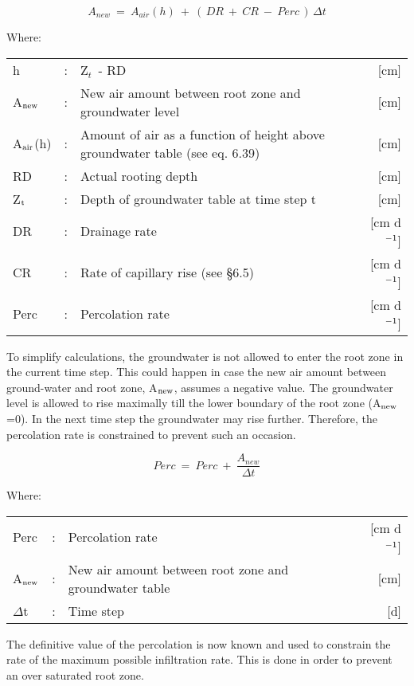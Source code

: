 \begin{equation}
 A_{new} ~=~ A_{air} (h) ~+~ (\, DR ~+~ CR ~-~ Perc\, )\, \Delta t
\end{equation}

Where:\\[5pt]
\begin{tabularx}{\textwidth}{llXr}
h &:& Z$_{t~}$ - RD & [cm]\\
A$_{{\rm new}}$ &:& New air amount between root zone and groundwater level  & [cm]\\
A$_{{\rm air}}$(h) &:& Amount of air as a function of height above groundwater
   table  (see eq. 6.39) & [cm]\\
RD &:& Actual rooting depth  & [cm]\\
Z$_{{\rm t}}$ &:& Depth of groundwater table at time step t  & [cm]\\
DR &:& Drainage rate  & [cm d$^{{\rm -1}}$]\\
CR &:& Rate of capillary rise (see \S 6.5)  & [cm d$^{{\rm -1}}$]\\
Perc &:& Percolation rate  & [cm d$^{{\rm -1}}$]\\
\end{tabularx}

To simplify calculations, the groundwater is not allowed to enter the root zone in the
current time step. This could happen in case the new air amount between ground-water
and root zone, A$_{{\rm new}}$, assumes a negative value. The groundwater level is allowed to rise
maximally till the lower boundary of the root zone (A$_{{\rm new}}$=0). In the next time step the
groundwater may rise further. Therefore, the percolation rate is constrained to prevent
such an occasion. 

\begin{equation}
Perc ~=~Perc ~+~{\frac{A _{new} }{\Delta t}}
\end{equation}

Where:\\[5pt]
\begin{tabularx}{\textwidth}{llXr}
Perc &:& Percolation rate   & [cm d$^{{\rm -1}}$]\\
A$_{{\rm new}}$ &:& New air amount between root zone and groundwater table  & [cm]\\
$\Delta$t &:& Time step  & [d]\\
\end{tabularx}

The definitive value of the percolation is now known and used to constrain the rate of the
maximum possible infiltration rate. This is done in order to prevent an over saturated root
zone.

